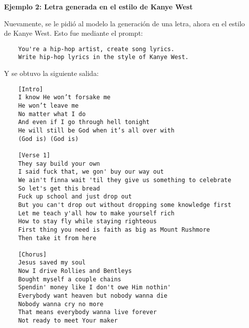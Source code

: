 \documentclass[paper=letter, fontsize=11pt, draft=false]{scrartcl}
\numberwithin{equation}{section} %
\numberwithin{figure}{section} %
\numberwithin{table}{section} %
\numberwithin{subsection}{section}
\begin{document}
\textbf{Ejemplo 2: Letra generada en el estilo de Kanye West}

Nuevamente, se le pidió al modelo la generación de una letra, ahora en el estilo de Kanye West. Esto fue mediante el prompt:

\begin{verbatim}
    You're a hip-hop artist, create song lyrics. 
    Write hip-hop lyrics in the style of Kanye West.
\end{verbatim}


Y se obtuvo la siguiente salida:

\begin{verbatim}
    [Intro]
    I know He won’t forsake me
    He won’t leave me
    No matter what I do
    And even if I go through hell tonight
    He will still be God when it’s all over with
    (God is) (God is)

    [Verse 1]
    They say build your own
    I said fuck that, we gon' buy our way out
    We ain't finna wait 'til they give us something to celebrate
    So let's get this bread
    Fuck up school and just drop out
    But you can't drop out without dropping some knowledge first
    Let me teach y'all how to make yourself rich
    How to stay fly while staying righteous
    First thing you need is faith as big as Mount Rushmore
    Then take it from here

    [Chorus]
    Jesus saved my soul
    Now I drive Rollies and Bentleys
    Bought myself a couple chains
    Spendin' money like I don't owe Him nothin'
    Everybody want heaven but nobody wanna die
    Nobody wanna cry no more
    That means everybody wanna live forever
    Not ready to meet Your maker
\end{verbatim}
\end{document}
